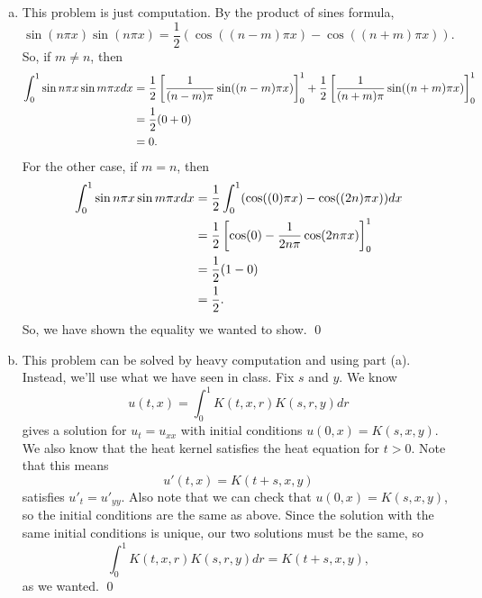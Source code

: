 \documentclass{article}
\begin{document}
\newpage
{}  \tri
\hop
\solution
\begin{enumerate}[(a)]
    \item This problem is just computation. By the product of sines formula, 
    \[\sin(n\pi x)\sin(n\pi x) = \frac{1}{2}(\cos((n-m)\pi x) - \cos((n+m)\pi x)).\]
    So, if $m \ne n$, then 
    \begin{align*}
        \int_0^1 \sin n\pi x \sin m \pi x dx&= \frac{1}{2}\sbr{\frac{1}{(n-m)\pi}\sin((n-m)\pi x)}_0^1+\frac{1}{2}\sbr{\frac{1}{(n+m)\pi}\sin((n+m)\pi x)}_0^1\\
        &= \frac{1}{2}(0+0)\\
        &= 0.
    \end{align*}
    For the other case, if $m = n$, then
    \begin{align*}
        \int_0^1 \sin n\pi x \sin m \pi x dx&=  \frac{1}{2}\int_0^1(\cos((0)\pi x) - \cos((2n)\pi x)) dx \\
        &= \frac{1}{2}\sbr{\cos(0) - \frac{1}{2n\pi}\cos(2n\pi x)}_0^1 \\
        &= \frac{1}{2}(1-0) \\
        &= \frac{1}{2}.
    \end{align*}
    So, we have shown the equality we wanted to show. \qed
    \item This problem can be solved by heavy computation and using part (a). Instead, we'll use what we have seen in class. Fix $s$ and $y$. We know 
    \[u(t,x)=\int_0^1K(t,x,r)K(s,r,y)dr\]
    gives a solution for $u_t = u_{xx}$ with initial conditions $u(0,x) = K(s,x,y)$. We also know that the heat kernel satisfies the heat equation for $t>0$. Note that this means
    \[u'(t,x) = K(t+s, x, y)\]
    satisfies $u'_t = u'_{yy}$. Also note that we can check that $u(0,x) = K(s,x,y)$, so the initial conditions are the same as above. Since the solution with the same initial conditions is unique, our two solutions must be the same, so 
    \[\int_0^1K(t,x,r)K(s,r,y)dr=K(t+s, x, y),\]
    as we wanted. \qed
\end{enumerate}
\end{document}
